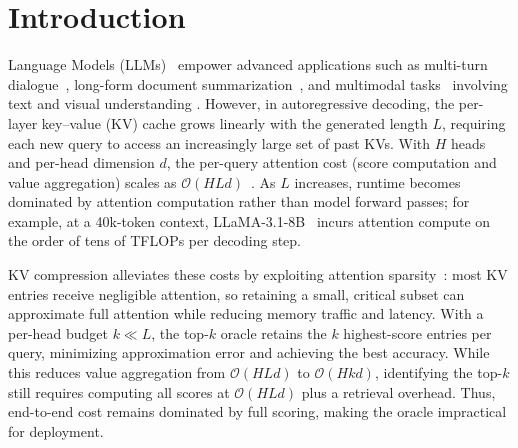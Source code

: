 \vspace{-0.05in}
\section{Introduction}
\label{sec:intro}
\vspace{-0.05in}

 Language Models (LLMs)~\cite{hurst2024gpt,liu2024deepseek,TPAMI2025LLM_Memristor} empower advanced applications such as multi-turn dialogue~\cite{yi2402survey,teng2024fine,ma2024multi}, long-form document summarization~\cite{zhang2023enhancing,liu2023learning}, and multimodal tasks~\cite{tu2023unsupervised,liu2023visual,lin2023video,tu2025global,TPAMI2025LLM_MultiModal,tu2025automatic} involving text and visual understanding \cite{TPAMI2025LLM_VQA,TPAMI2025LLM_Creativity,tu2025multimodal,TPAMI2025LLM_Disease,lan2025survey,tu2025mllm}. %
However, in autoregressive decoding, the per-layer key–value (KV) cache grows linearly with the generated length $L$, requiring each new query to access an increasingly large set of past KVs.
With $H$ heads and per-head dimension $d$, the per-query attention cost (score computation and value aggregation) scales as $\mathcal{O}(HLd)$~\cite{vaswani2017attention}. As $L$ increases, runtime becomes dominated by attention computation rather than model forward passes; %
for example, at a 40k-token context, LLaMA-3.1-8B~\cite{touvron2023llama} incurs attention compute on the order of tens of TFLOPs per decoding step.

KV compression alleviates these costs by exploiting attention sparsity~\cite{wang2020linformer,sun2025vorta,zhang2023h2o,xiao2023streamingllm}: most KV entries receive negligible attention, so retaining a small, critical subset can approximate full attention while reducing memory traffic and latency. With a per-head budget $k\!\ll\!L$, the top-$k$ oracle retains the $k$ highest-score entries per query, minimizing approximation error and achieving the best accuracy. While this reduces value aggregation from $\mathcal{O}(HLd)$ to $\mathcal{O}(Hkd)$, identifying the top-$k$ still requires computing all scores at $\mathcal{O}(HLd)$ plus a retrieval overhead. Thus, end-to-end cost remains dominated by full scoring, making the oracle impractical for deployment.


